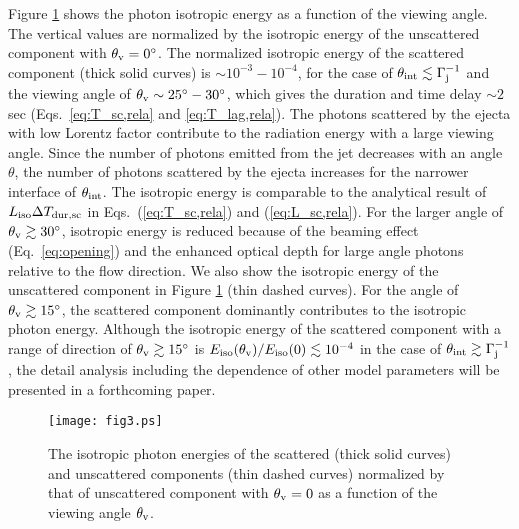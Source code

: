 \documentclass{emulateapj}
\begin{document}
Figure \ref{fig:montecarlo} shows the photon isotropic energy as a function of the viewing angle. 
The vertical values are normalized by the isotropic energy of the unscattered component with $\theta_{\rm v}=0^\circ$. 
The normalized isotropic energy of the scattered component (thick solid curves) is $\sim10^{-3}-10^{-4}$, 
for the case of $\theta_{\rm int}\lesssim\Gamma_{\rm j}^{-1}$ and the viewing angle of $\theta_{\rm v}\sim25^\circ-30^\circ$, 
which gives the duration and time delay $\sim 2$ sec (Eqs.~\ref{eq:T_sc,rela} and \ref{eq:T_lag,rela}). 
The photons scattered by the ejecta with low Lorentz factor contribute to the radiation energy with a large viewing angle.
Since the number of photons emitted from the jet decreases with an angle $\theta$, 
the number of photons scattered by the ejecta increases for the narrower interface of  $\theta_{\rm int}$.
The isotropic energy is comparable to the analytical result of $L_{\rm iso}\Delta T_{\rm dur,sc}$ 
in Eqs.~(\ref{eq:T_sc,rela}) and (\ref{eq:L_sc,rela}). 
For the larger angle of $\theta_{\rm v}\gtrsim30^\circ$, isotropic energy is reduced 
because of the beaming effect (Eq.~\ref{eq:opening}) 
and the enhanced optical depth for large angle photons relative to the flow direction. 
We also show the isotropic energy of the unscattered component in Figure \ref{fig:montecarlo} (thin dashed curves). 
For the angle of $\theta_{\rm v}\gtrsim15^\circ$, the scattered component dominantly contributes to the isotropic photon energy. 
Although the isotropic energy of the scattered component with a range of direction of $\theta_{\rm v}\gtrsim15^\circ$ is 
$E_{\rm iso}(\theta_{\rm v})/E_{\rm iso}(0)\lesssim10^{-4}$ in the case of $\theta_{\rm int}\gtrsim\Gamma_{\rm j}^{-1}$, 
the detail analysis including the dependence of other model parameters will be presented in a forthcoming paper.

\begin{figure}
 \begin{center}
  \texttt{[image: fig3.ps]}
   \caption{The isotropic photon energies of the scattered (thick solid curves) and unscattered components (thin dashed curves) normalized by that of unscattered component with $\theta_{\rm v}=0$
 as a function of the viewing angle $\theta_{\rm v}$.}
  \label{fig:montecarlo}
 \end{center}
\end{figure}
\end{document}
